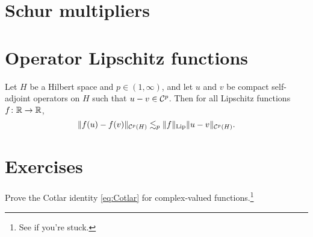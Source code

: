 \section{Schur multipliers}

\section{Operator Lipschitz functions}

\begin{thm}
  Let $H$ be a Hilbert space and $p \in (1,\infty)$, and let $u$ and $v$ be compact self-adjoint operators on $H$ such that $u - v \in \mathcal{C}^{p}$.
  Then for all Lipschitz functions $f \colon \mathbb{R} \rightarrow \mathbb{R}$,
  \begin{equation*}
    \|f(u) - f(v)\|_{\mathcal{C}^{p}(H)} \lesssim_{p} \|f\|_{\mathrm{Lip}} \|u - v\|_{\mathcal{C}^{p}(H)}.
  \end{equation*}
\end{thm}

\section{Exercises}

\begin{exercise}\label{ex:Cotlar}
  Prove the Cotlar identity \eqref{eq:Cotlar} for complex-valued functions.\footnote{See \cite[.a]{HNVW16} if you're stuck.}
\end{exercise}

